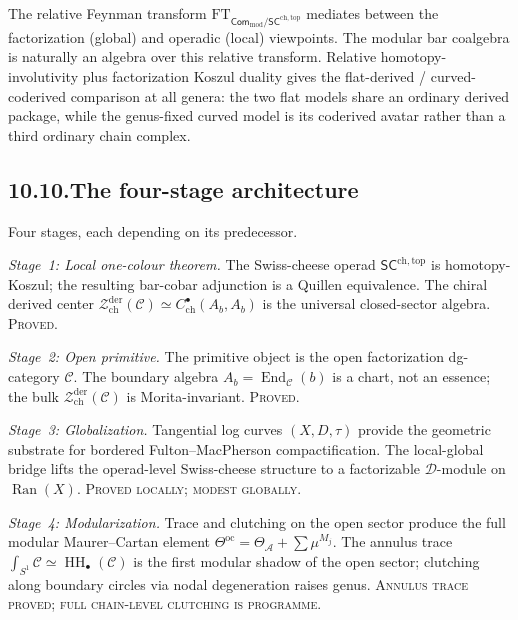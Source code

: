 \documentclass[11pt]{report}
\theoremstyle{definition}
\theoremstyle{remark}
\providecommand{\cA}{\mathcal{A}}
\providecommand{\cZ}{\mathcal{Z}}
\numberwithin{equation}{section}
\begin{document}
The relative Feynman transform
$\mathrm{FT}_{\mathsf{Com}_{\mathrm{mod}}/\mathsf{SC}^{\mathrm{ch,top}}}$
mediates between the factorization (global) and operadic (local)
viewpoints. The modular bar coalgebra is naturally an algebra over
this relative transform. Relative homotopy-involutivity plus
factorization Koszul duality gives the flat-derived /
curved-coderived comparison at all genera: the two flat models share
an ordinary derived package, while the genus-fixed curved model is
its coderived avatar rather than a third ordinary chain complex.

\subsection*{10.10.\enspace The four-stage architecture}

Four stages, each depending on its predecessor.

\medskip
\noindent
\emph{Stage~1: Local one-colour theorem.}
The Swiss-cheese operad $\mathsf{SC}^{\mathrm{ch,top}}$ is
homotopy-Koszul; the resulting bar-cobar adjunction is a Quillen
equivalence. The chiral derived center
$\cZ^{\mathrm{der}}_{\mathrm{ch}}(\mathcal C)
\simeq C^\bullet_{\mathrm{ch}}(A_b, A_b)$
is the universal closed-sector algebra. \textsc{Proved.}

\medskip
\noindent
\emph{Stage~2: Open primitive.}
The primitive object is the open factorization dg-category
$\mathcal C$. The boundary algebra
$A_b = \operatorname{End}_{\mathcal C}(b)$ is a chart, not an
essence; the bulk $\cZ^{\mathrm{der}}_{\mathrm{ch}}(\mathcal C)$
is Morita-invariant. \textsc{Proved.}

\medskip
\noindent
\emph{Stage~3: Globalization.}
Tangential log curves $(X,D,\tau)$ provide the geometric substrate
for bordered Fulton--MacPherson compactification. The local-global
bridge lifts the operad-level Swiss-cheese structure to a
factorizable $\mathcal D$-module on $\operatorname{Ran}(X)$.
\textsc{Proved locally; modest globally.}

\medskip
\noindent
\emph{Stage~4: Modularization.}
Trace and clutching on the open sector produce the full modular
Maurer--Cartan element $\Theta^{\mathrm{oc}} = \Theta_\cA
+ \sum \mu^{M_j}$. The annulus trace
$\int_{S^1}\mathcal C \simeq \operatorname{HH}_\bullet(\mathcal C)$
is the first modular shadow of the open sector; clutching
along boundary circles via nodal degeneration raises genus.
\textsc{Annulus trace proved; full chain-level clutching is
programme.}
\end{document}
